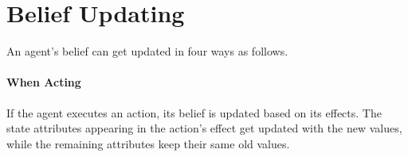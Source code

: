 \documentclass[letterpaper]{article} %
\newtheorem{definition}{Definition}
\begin{document}










\section{Belief Updating}
An agent's belief can get updated in four ways as follows. 

\paragraph{When Acting}
If the agent executes an action, its belief is updated based on its effects. The state attributes appearing in the action's effect get updated with the new values, while the remaining attributes keep their same old values.
\end{document}
